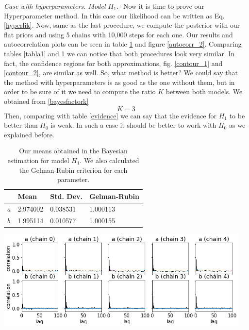 \documentclass[onecolumn,           %
               showpacs,            %
               preprintnumbers,     %
               aps,                 %
               letterpaper,             %
               superscriptaddress,      %
               nofootinbib,         %
               tightenlines,        %
               floats,floatfix      %
               ,usenatbib,
               ]{revtex4-1}
\begin{document}
\textit{Case with hyperparameters. Model $H_1$.-} Now it is time to prove our Hyperparameter method. In this case our likelihood can be written as Eq. \eqref{hyperlik}. Now, same as the last procedure, we compute the posterior with our flat priors and using 5 chains with 10,000 steps for each one. Our results and autocorrelation plots can be seen in table \ref{tab} and figure \ref{autocorr_2}. Comparing tables \ref{tabla1} and \ref{tab} we can notice that both procedures look very similar. In fact, the confidence regions for both approximations, fig. \ref{contour_1} and \ref{contour_2}, are similar as well. So, what method is better? We could say that the method with hyperparameters is as good as the one without them, but in order to be sure of it we need to compute the ratio $K$ between both models. We obtained from \eqref{bayesfactork} 
\begin{equation}
K = 3
\end{equation}
Then, comparing with table \ref{evidence} we can say that the evidence for $H_1$ to be better than $H_0$ is weak. In such a case it should be better to work with $H_0$ as we explained before.

\begin{table}[h!]
\centering
\begin{tabular}{||l|l|l|l||} 
 \hline
 & \textbf{Mean} & \textbf{Std. Dev.} & \textbf{Gelman-Rubin} \\ [0.5ex] 
 \hline\hline
$a$ & 2.974002 	 & 0.038531 & 1.000113 \\
\hline
$b$ & 1.995114 & 0.010577 	 & 1.000155\\ [1ex] 
 \hline
\end{tabular}
\caption{\footnotesize{Our means obtained in the Bayesian estimation for model $H_1$. We also calculated the Gelman-Rubin criterion for each parameter.}}
\label{tab}
\end{table}

\begin{minipage}{\textwidth}
\centering
\includegraphics[height=5cm]{Figures/autocorr_2.png}
\label{autocorr_2}
\end{minipage}
\\$ $
\end{document}
